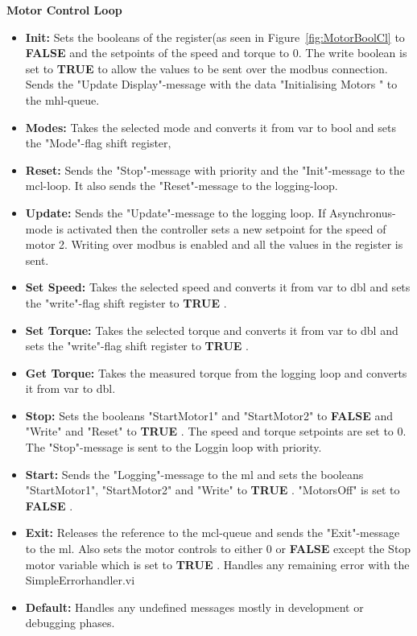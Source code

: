 \documentclass{ol-softwaremanual}
\newcommand{\figref}[1]{Figure~\ref{#1}}
\newcommand{\true}{\textbf{TRUE} }
\newcommand{\false}{\textbf{FALSE} }
\begin{document}
\textbf{Motor Control Loop}
\begin{itemize}
    \item \textbf{Init:} Sets the \glspl{boolean} of the register(as seen in \figref{fig:MotorBoolCl}  to \false and the setpoints of the speed and torque to $0$. The write \gls{boolean} is set to \true to allow the values to be sent over the modbus connection. Sends the "Update Display"-message with the data "Initialising Motors " to the \acrshort{mhl}-queue. 
    \item \textbf{Modes:} Takes the selected mode and converts it from \gls{var} to bool and sets the "Mode"-flag shift register,
    \item \textbf{Reset:} Sends the "Stop"-message with priority and the "Init"-message to the \acrshort{mcl}-loop. It also sends the "Reset"-message to the logging-loop.
    \item \textbf{Update:} Sends the "Update"-message to the logging loop. If Asynchronus-mode is activated then the controller sets a new setpoint for the speed of motor 2. Writing over modbus is enabled and all the values in the register is sent.
    \item \textbf{Set Speed:} Takes the selected speed and converts it from \gls{var} to \gls{dbl} and sets the "write"-flag shift register to \true. 
    \item \textbf{Set Torque:} Takes the selected torque and converts it from \gls{var} to \gls{dbl} and sets the "write"-flag shift register to \true. 
    \item \textbf{Get Torque:}  Takes the measured torque from the logging loop and converts it from \gls{var} to \gls{dbl}.
    \item \textbf{Stop:} Sets the booleans "StartMotor1" and "StartMotor2" to \false and "Write" and "Reset" to \true. The speed and torque setpoints are set to $0$. The "Stop"-message is sent to the Loggin loop with priority.
    \item \textbf{Start:}  Sends the "Logging"-message to the \acrshort{ml} and sets the booleans "StartMotor1", "StartMotor2" and "Write" to \true. "MotorsOff" is set to \false. 
    \item \textbf{Exit:} Releases the reference to the \acrshort{mcl}-queue and sends the "Exit"-message to the \acrshort{ml}. Also sets the motor controls to either $0$ or {\false} except the Stop motor variable which is set to {\true}. Handles any remaining error with the SimpleErrorhandler.vi
    \item \textbf{Default:} Handles any undefined messages mostly in development or debugging phases. 
\end{itemize}
\end{document}
